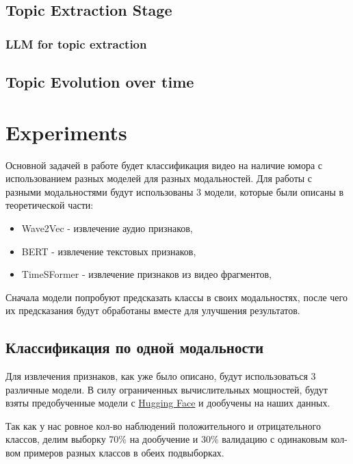 \documentclass[PMI,VKR]{HSEUniversity}
\begin{document}
\section{Topic Extraction Stage}


\subsection{LLM for topic extraction}


\section{Topic Evolution over time}






\newpage
\chapter{Experiments}

Основной задачей в работе будет классификация видео на наличие юмора с использованием разных моделей для разных модальностей.
Для работы с разными модальностями будут использованы 3 модели, которые были описаны в теоретической части:
\begin{itemize}
    \item Wave2Vec - извлечение аудио признаков,
    \item BERT - извлечение текстовых признаков,
    \item TimeSFormer - извлечение признаков из видео фрагментов,
\end{itemize}

Сначала модели попробуют предсказать классы в своих модальностях, после чего их предсказания будут обработаны вместе для улучшения результатов.

\section{Классификация по одной модальности}

Для извлечения признаков, как уже было описано, будут использоваться 3 различные модели. В силу ограниченных вычислительных мощностей, будут взяты предобученные модели с \href{https://huggingface.co/}{Hugging Face} и дообучены на наших данных.

Так как у нас ровное кол-во наблюдений положительного и отрицательного классов, делим выборку 70\% на дообучение и 30\% валидацию с одинаковым кол-вом примеров разных классов в обеих подвыборках.
\end{document}
